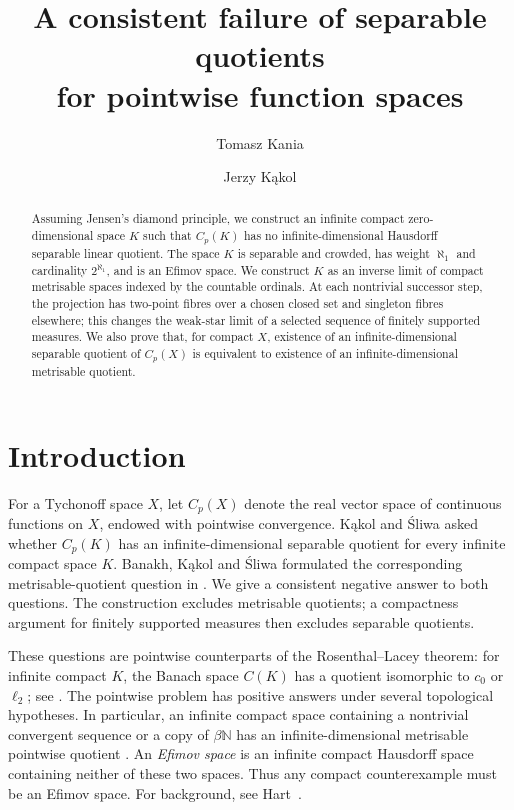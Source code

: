 \documentclass[a4paper,11pt]{amsart}
\title[A consistent failure of separable quotients]
{A consistent failure of separable quotients\protect\\for pointwise function spaces}
\author[T.~Kania]{Tomasz Kania}
\author[J.~K\k{a}kol]{Jerzy K\k{a}kol}
\date{}
\theoremstyle{plain}
\theoremstyle{definition}
\theoremstyle{remark}
\newcommand{\N}{\mathbb N}
\numberwithin{equation}{section}
\begin{document}
\raggedbottom
\begin{abstract}
Assuming Jensen's diamond principle, we construct an infinite compact zero-dimensional space $K$ such that $C_p(K)$ has no infinite-dimensional Hausdorff separable linear quotient. The space $K$ is separable and crowded, has weight $\aleph_1$ and cardinality $2^{\aleph_1}$, and is an Efimov space. We construct $K$ as an inverse limit of compact metrisable spaces indexed by the countable ordinals. At each nontrivial successor step, the projection has two-point fibres over a chosen closed set and singleton fibres elsewhere; this changes the weak-star limit of a selected sequence of finitely supported measures. We also prove that, for compact $X$, existence of an infinite-dimensional separable quotient of $C_p(X)$ is equivalent to existence of an infinite-dimensional metrisable quotient.
\end{abstract}
\maketitle

\section{Introduction}

For a Tychonoff space $X$, let $C_p(X)$ denote the real vector space of continuous functions on $X$, endowed with pointwise convergence. K\k{a}kol and \'Sliwa \cite{KS2018} asked whether $C_p(K)$ has an infinite-dimensional separable quotient for every infinite compact space $K$. Banakh, K\k{a}kol and \'Sliwa formulated the corresponding metrisable-quotient question in \cite[Problem~2]{BKS2018}. We give a consistent negative answer to both questions. The construction excludes metrisable quotients; a compactness argument for finitely supported measures then excludes separable quotients.

These questions are pointwise counterparts of the Rosenthal--Lacey theorem: for infinite compact $K$, the Banach space $C(K)$ has a quotient isomorphic to $c_0$ or $\ell_2$; see \cite{Rosenthal,Lacey}. The pointwise problem has positive answers under several topological hypotheses. In particular, an infinite compact space containing a nontrivial convergent sequence or a copy of $\beta\N$ has an infinite-dimensional metrisable pointwise quotient \cite[Theorem~1 and Corollary~3]{BKS2018}. An \emph{Efimov space} is an infinite compact Hausdorff space containing neither of these two spaces. Thus any compact counterexample must be an Efimov space. For background, see Hart~\cite{Hart}.
\end{document}
